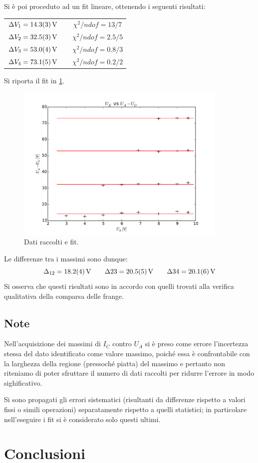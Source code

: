 Si è poi proceduto ad un fit lineare, ottenendo i seguenti risultati:
	\begin{table}[H]
		\centering
		\begin{tabular}{ccc}
			$\Delta V_1 = \SI{14.3 \pm 0.3}{\volt}$ && $\chi^2/ndof = 13/7$\\
			$\Delta V_2 = \SI{32.5 \pm 0.3}{\volt}$ && $\chi^2/ndof = 2.5/5$\\
			$\Delta V_3 = \SI{53.0 \pm 0.4}{\volt}$ && $\chi^2/ndof = 0.8/3$\\
			$\Delta V_4 = \SI{73.1 \pm 0.5}{\volt}$ && $\chi^2/ndof = 0.2/2$\\
		\end{tabular}
	\end{table}
	Si riporta il fit in \figurename{ \ref{fit}}.

		\begin{figure} [!h]
			\centering
			\includegraphics[width=0.9\textwidth]{../Figs-tabs/fit.pdf}
			\caption{Dati raccolti e fit.}
			\label{fit}
		\end{figure}

	Le differenze tra i massimi sono dunque:
	$$\Delta_{12}=\SI{18.2\pm 0.4}{\volt} \qquad \Delta{23}=\SI{20.5 \pm 0.5}{\volt} \qquad \Delta{34}=\SI{20.1 \pm 0.6}{\volt}$$
	Si osserva che questi risultati sono in accordo con quelli trovati alla verifica qualitativa della comparsa delle frange.

\subsection{Note}
Nell'acquisizione dei massimi di $I_C$ contro $U_A$ si è preso come errore
l'incertezza stessa del dato identificato come valore massimo, poiché essa è confrontabile con
la larghezza della regione (pressoché piatta) del massimo e pertanto non riteniamo
di poter sfruttare il numero di dati raccolti per ridurre l'errore in modo sighificativo.

Si sono propagati gli errori sistematici (risultanti da differenze rispetto a valori fissi
o simili operazioni) separatamente rispetto a quelli statistici; in particolare
nell'eseguire i fit si è considerato solo questi ultimi.

\section{Conclusioni}

